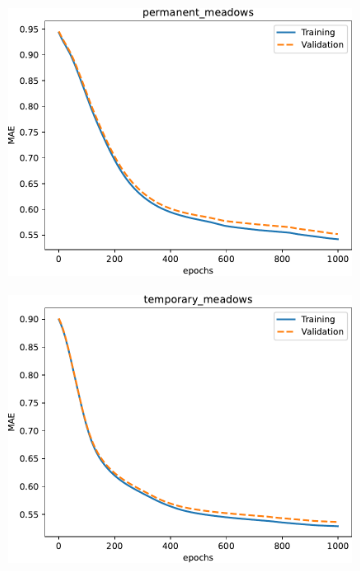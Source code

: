 \documentclass[journal,article,submit,pdftex,moreauthors]{Definitions/mdpi}
\begin{document}
\begin{figure}[H]
\begin{subfigure}[t]{0.3\textwidth}
		\includegraphics[width=\linewidth]{figures/results_040923/loss_permanent_meadows.pdf}
	\caption{}
	\label{fig:loss_pm}
	\end{subfigure}\hfill
	\begin{subfigure}[t]{0.3\textwidth}
		\includegraphics[width=\textwidth]{figures/results_040923/loss_temporary_meadows.pdf}
	\caption{}
	\label{fig:loss_tm}
	\end{subfigure}\\[0.2cm]
	\begin{subfigure}[t]{0.3\textwidth}

\end{subfigure}
\end{figure}
\end{document}
